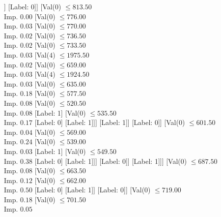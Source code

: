 \documentclass[margin=10pt]{standalone}
\begin{document}
\begin{forest}[Val($3$) $ \leq 2.50$ \\ Imp. $0.00$
	[Val($0$) $ \leq 510.50$ \\ Imp. $0.00$
		[Val($0$) $ \leq 507.00$ \\ Imp. $0.03$
			[Val($0$) $ \leq 504.50$ \\ Imp. $0.38$
				[Label: 0]
				[Label: 1]]
			[Label: 0]]
		[Val($0$) $ \leq 813.50$ \\ Imp. $0.00$
			[Val($0$) $ \leq 776.00$ \\ Imp. $0.03$
				[Val($0$) $ \leq 770.00$ \\ Imp. $0.02$
					[Val($0$) $ \leq 736.50$ \\ Imp. $0.02$
						[Val($0$) $ \leq 733.50$ \\ Imp. $0.03$
							[Val($4$) $ \leq 1975.50$ \\ Imp. $0.02$
								[Val($0$) $ \leq 659.00$ \\ Imp. $0.03$
									[Val($4$) $ \leq 1924.50$ \\ Imp. $0.03$
										[Val($0$) $ \leq 635.00$ \\ Imp. $0.18$
											[Val($0$) $ \leq 577.50$ \\ Imp. $0.08$
												[Val($0$) $ \leq 520.50$ \\ Imp. $0.08$
													[Label: 1]
													[Val($0$) $ \leq 535.50$ \\ Imp. $0.17$
														[Label: 0]
														[Label: 1]]]
												[Label: 1]]
											[Label: 0]]
										[Val($0$) $ \leq 601.50$ \\ Imp. $0.04$
											[Val($0$) $ \leq 569.00$ \\ Imp. $0.24$
												[Val($0$) $ \leq 539.00$ \\ Imp. $0.03$
													[Label: 1]
													[Val($0$) $ \leq 549.50$ \\ Imp. $0.38$
														[Label: 0]
														[Label: 1]]]
												[Label: 0]]
											[Label: 1]]]
									[Val($0$) $ \leq 687.50$ \\ Imp. $0.08$
										[Val($0$) $ \leq 663.50$ \\ Imp. $0.12$
											[Val($0$) $ \leq 662.00$ \\ Imp. $0.50$
												[Label: 0]
												[Label: 1]]
											[Label: 0]]
										[Val($0$) $ \leq 719.00$ \\ Imp. $0.18$
											[Val($0$) $ \leq 701.50$ \\ Imp. $0.05$

\end{forest}
\end{document}
